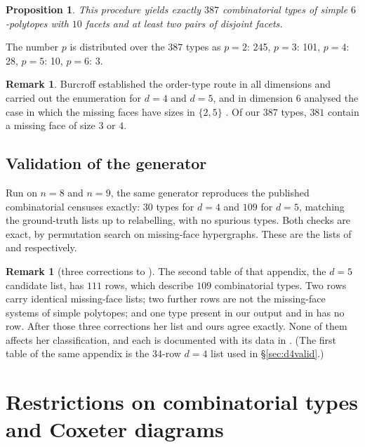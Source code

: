 \documentclass[11pt,reqno]{amsart}
\theoremstyle{plain}
\newtheorem{proposition}[theorem]{Proposition}
\theoremstyle{definition}
\newtheorem{remark}[theorem]{Remark}
\newcommand{\NumTypes}{387}
\newcommand{\NumTypesMF}{381}
\begin{document}
\begin{proposition}
\label{prop:387}
This procedure yields exactly $\NumTypes$ combinatorial types of simple
$6$-polytopes with $10$ facets and at least two pairs of disjoint facets.
\end{proposition}

The number $p$ is distributed over the $\NumTypes$ types as
$p=2$: 245, $p=3$: 101, $p=4$: 28, $p=5$: 10, $p=6$: 3.

\begin{remark}
Burcroff established the order-type route in all dimensions and carried out the
enumeration for $d=4$ and $d=5$, and in dimension $6$ analysed the case in which
the missing faces have sizes in $\{2,5\}$ \cite[\S3, \S8]{Burcroff2024}. Of our
$\NumTypes$ types, $\NumTypesMF$ contain a missing face of size $3$ or $4$.
\end{remark}

\subsection{Validation of the generator}
\label{sec:genvalid}

Run on $n=8$ and $n=9$, the same generator reproduces the published combinatorial
censuses exactly: $30$ types for $d=4$ and $109$ for $d=5$, matching the
ground-truth lists up to relabelling, with no spurious types. Both checks are
exact, by permutation search on missing-face hypergraphs. These are the
lists of \cite{GruenbaumSreedharan1967} and \cite{MaZheng2023} respectively.

\begin{remark}[three corrections to {\cite[Appendix~A]{Burcroff2024}}]
\label{rem:appendixA}
The second table of that appendix, the $d=5$ candidate list, has $111$ rows, which
describe $109$ combinatorial types. Two rows carry identical missing-face lists;
two further rows are not the missing-face systems of simple polytopes; and one type
present in our output and in \cite{MaZheng2023} has no row. After those three
corrections her list and ours agree exactly. None of them affects her
classification, and each is documented with its data in \cite{Repo}. (The first
table of the same appendix is the $34$-row $d=4$ list used in
\S\ref{sec:d4valid}.)
\end{remark}

\section{Restrictions on combinatorial types and Coxeter diagrams}
\label{sec:filters}
\label{sec:completeness}
\end{document}
